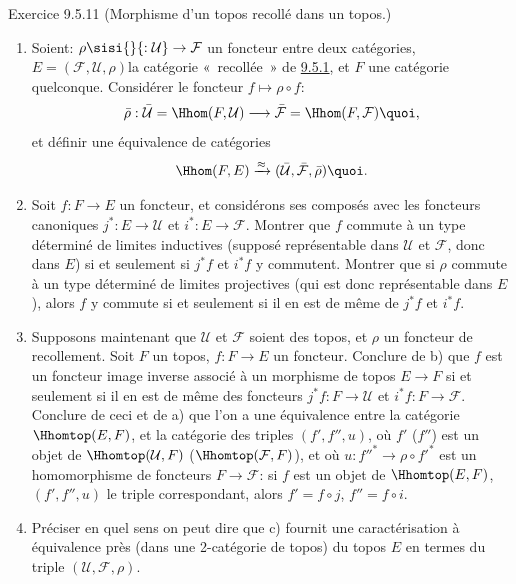 \begin{enonce*}[remark]{Exercice 9.5.11}
(Morphisme d'un topos recollé dans un topos.)
\begin{enumerate}
\renewcommand{\theenumi}{\alph{enumi}}
\renewcommand{\labelenumi}{\theenumi)}
\item Soient: $\rho \sisi{}{: \mathcal{U}} \rightarrow \mathcal{F}$ un foncteur entre deux
catégories, $E=(\mathcal{F},\mathcal{U},\rho)$\pageoriginale la
catégorie « recollée »  de \hyperref[IV.subsubsec9.5.1]{9.5.1}, et $F$ une
catégorie quelconque. Considérer le foncteur $f\mapsto \rho\circ f$:
$$
\bar{\rho}:\bar{\mathcal{U}}=\Hhom(F,\mathcal{U})\longrightarrow
\bar{\mathcal{F}}=\Hhom(F,\mathcal{F}){\quoi},
$$
et définir une équivalence de catégories
$$
\Hhom(F,E)\xrightarrow{\approx}(\bar{\mathcal{U}},\bar{\mathcal{F}},\bar{\rho}){\quoi}.
$$

\item Soit $f:F\rightarrow E$ un foncteur, et considérons ses composés
avec les foncteurs canoniques $j^{\ast}:E\rightarrow \mathcal{U}$ et
$i^{\ast}:E\rightarrow \mathcal{F}$. Montrer que $f$ commute à un
type déterminé de limites inductives (supposé représentable dans
$\mathcal{U}$ et $\mathcal{F}$, donc dans $E$) si et seulement si
$j^{\ast}f$ et $i^{\ast}f$ y commutent. Montrer que si $\rho$
commute à un type déterminé de limites projectives (qui est donc
représentable dans $E$), alors $f$ y commute si et seulement si il
en est de même de $j^{\ast}f$ et $i^{\ast}f$.

\item Supposons maintenant que $\mathcal{U}$ et $\mathcal{F}$ soient
  des topos, et
$\rho$ un foncteur de recollement. Soit $F$ un topos,
$f:F\rightarrow E$ un foncteur. Conclure de b) que $f$ est un
foncteur image inverse associé à un morphisme de topos $E\rightarrow
F$ si et seulement si il en est de même des foncteurs
$j^{\ast}f:F\rightarrow \mathcal{U}$ et $i^{\ast}f:F\rightarrow
\mathcal{F}$. Conclure de ceci et de a) que l'on a une équivalence
entre la catégorie $\Hhomtop(E,F)$, et la catégorie des triples
$(f',f'',u)$, où $f'$ (\resp $f''$) est un objet de
$\Hhomtop(\mathcal{U}, F)$ (\resp $\Hhomtop(\mathcal{F}, F)$), et où
$u:{f''}^{\ast}\rightarrow \rho\circ {f'}^{\ast}$ est un
homomorphisme de foncteurs $F\rightarrow \mathcal{F}$: si $f$ est un
objet de $\Hhomtop(E,F)$, $(f',f'',u)$ le triple correspondant,
alors $f'=f\circ j$, $f''=f\circ i$.

\item Préciser en quel sens on peut dire que c) fournit une
caractérisation à équivalence près (dans une 2-catégorie de topos)
du topos $E$ en termes du triple $(\mathcal{U},\mathcal{F},\rho)$.
\end{enumerate}
\end{enonce*}

